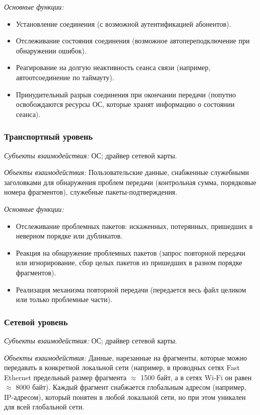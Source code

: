 \emph{Основные функции:}
\begin{itemize}
    \item Установление соединения (с возможной аутентификацией абонентов).
    \item Отслеживание состояния соединения (возможное автопереподключение при обнаружении ошибок).
    \item Реагирование на долгую неактивность сеанса связи (например, автоотсоединение по таймауту).
    \item Принудительный разрыв соединения при окончании передачи (попутно освобождаются ресурсы ОС, которые хранят информацию о состоянии сеанса).
\end{itemize}

\subsubsection*{Транспортный уровень}\label{subsubsec:transport-layer}

\emph{Субъекты взаимодействия:} ОС; драйвер сетевой карты.

\emph{Объекты взаимодействия:} Пользовательские данные, снабженные служебными заголовками для обнаружения проблем передачи (контрольная сумма, порядковые номера фрагментов), служебные пакеты-подтверждения.

\emph{Основные функции:}
\begin{itemize}
    \item Отслеживание проблемных пакетов: искаженных, потерянных, пришедших в неверном порядке или дубликатов.
    \item Реакция на обнаружение проблемных пакетов (запрос повторной передачи или игнорирование, сбор целых пакетов из пришедших в разном порядке фрагментов).
    \item Реализация механизма повторной передачи (передается весь файл целиком или только проблемные части).
\end{itemize}

\subsubsection*{Сетевой уровень}\label{subsubsec:network-layer}

\emph{Субъекты взаимодействия:} ОС; драйвер сетевой карты.

\emph{Объекты взаимодействия:} Данные, нарезанные на фрагменты, которые можно передавать в конкретной локальной сети (например, в
проводных сетях Fast Ethernet предельный размер фрагмента $\approx$ 1500 байт, а в сетях Wi-Fi он равен $\approx$ 8000 байт). Каждый фрагмент снабжается глобальным адресом (например, IP-адресом), который понятен в любой локальной сети, но при этом уникален для всей
глобальной сети.

